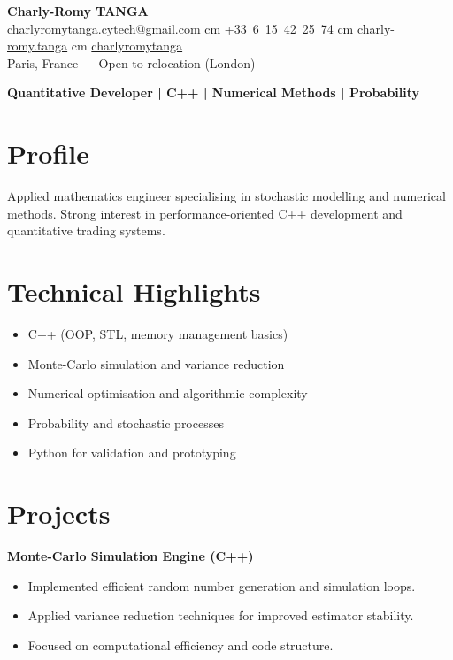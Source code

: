 \documentclass[10pt, letterpaper]{article}
\begin{document}
\begin{center}
    \textbf{\LARGE Charly-Romy TANGA} \\[0.2cm]
    \mbox{\href{mailto:charlyromytanga.cytech@gmail.com}{\footnotesize\faEnvelope\hspace*{0.1cm}charlyromytanga.cytech@gmail.com}}
     cm
    \mbox{\faPhone\hspace*{0.1cm}+33 6 15 42 25 74}
     cm
    \mbox{\href{https://www.linkedin.com/in/charly-romy-tanga}{\footnotesize\faLinkedin\hspace*{0.1cm}charly-romy.tanga}}
     cm
    \mbox{\href{https://github.com/charlyromytanga}{\footnotesize\faGithub\hspace*{0.1cm}charlyromytanga}}
    \\[0.2cm]
    Paris, France --- Open to relocation (London)
\end{center}

\vspace{0.2cm}
\textbf{Quantitative Developer | C++ | Numerical Methods | Probability}

\section*{Profile}
Applied mathematics engineer specialising in stochastic modelling and numerical methods. Strong interest in performance-oriented C++ development and quantitative trading systems.

\section*{Technical Highlights}
\begin{itemize}[leftmargin=0.5cm]
\item C++ (OOP, STL, memory management basics)
\item Monte-Carlo simulation and variance reduction
\item Numerical optimisation and algorithmic complexity
\item Probability and stochastic processes
\item Python for validation and prototyping
\end{itemize}

\section*{Projects}
\textbf{Monte-Carlo Simulation Engine (C++)}
\begin{itemize}[leftmargin=0.5cm]
\item Implemented efficient random number generation and simulation loops.
\item Applied variance reduction techniques for improved estimator stability.
\item Focused on computational efficiency and code structure.
\end{itemize}
\end{document}
